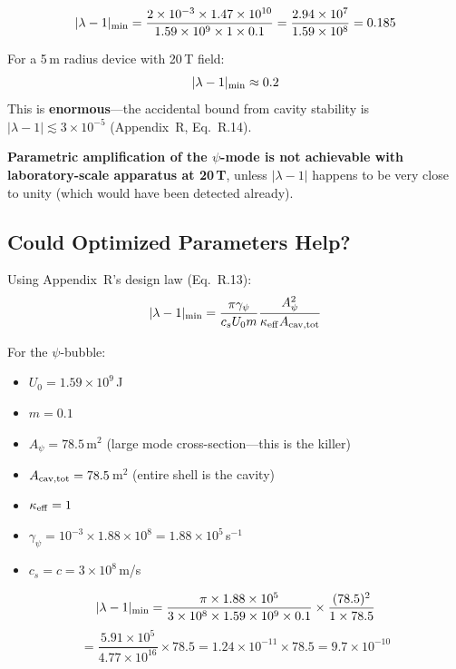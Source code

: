 \documentclass[12pt,letterpaper]{article}
\begin{document}
\begin{equation}
|\lambda - 1|_{\rm min} = \frac{2 \times 10^{-3} \times 1.47 \times 10^{10}}{1.59 \times 10^9 \times 1 \times 0.1}
= \frac{2.94 \times 10^7}{1.59 \times 10^8} = 0.185
\end{equation}

\begin{tcolorbox}[colback=red!5!white, colframe=red!60!black, title=Parametric Threshold Result]
For a 5\,m radius device with 20\,T field:
\begin{equation}
|\lambda - 1|_{\rm min} \approx 0.2
\end{equation}
This is \textbf{enormous}---the accidental bound from cavity stability is
$|\lambda - 1| \lesssim 3 \times 10^{-5}$ (Appendix~R, Eq.~R.14).

\textbf{Parametric amplification of the $\psi$-mode is not achievable with
laboratory-scale apparatus at 20\,T}, unless $|\lambda - 1|$ happens to be
very close to unity (which would have been detected already).
\end{tcolorbox}

\subsection{Could Optimized Parameters Help?}

Using Appendix~R's design law (Eq.~R.13):
\begin{equation}
|\lambda - 1|_{\rm min} = \frac{\pi \gamma_\psi}{c_s U_0 m}\frac{A_\psi^2}{\kappa_{\rm eff} A_{\rm cav,tot}}
\end{equation}

For the $\psi$-bubble:
\begin{itemize}
\item $U_0 = 1.59 \times 10^9$\,J
\item $m = 0.1$
\item $A_\psi = 78.5$\,m$^2$ (large mode cross-section---this is the killer)
\item $A_{\rm cav,tot} = 78.5$\,m$^2$ (entire shell is the cavity)
\item $\kappa_{\rm eff} = 1$
\item $\gamma_\psi = 10^{-3} \times 1.88 \times 10^8 = 1.88 \times 10^5$\,s$^{-1}$
\item $c_s = c = 3 \times 10^8$\,m/s
\end{itemize}

\begin{equation}
|\lambda - 1|_{\rm min} = \frac{\pi \times 1.88 \times 10^5}{3 \times 10^8 \times 1.59 \times 10^9 \times 0.1}
\times \frac{(78.5)^2}{1 \times 78.5}
\end{equation}
\begin{equation}
= \frac{5.91 \times 10^5}{4.77 \times 10^{16}} \times 78.5 = 1.24 \times 10^{-11} \times 78.5 = 9.7 \times 10^{-10}
\end{equation}
\end{document}
